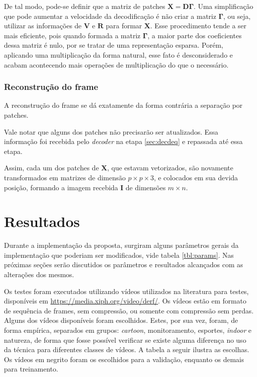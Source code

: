 \documentclass[cic,tc]{iiufrgs}
\newcommand{\mat}[1]{\bm{#1}}
\begin{document}
De tal modo, pode-se definir que a matriz de patches $\mat{X} = \mat{D} \mat{\Gamma}$.
Uma simplificação que pode aumentar a velocidade da decodificação é não criar a matriz $\mat{\Gamma}$,
ou seja, utilizar as informações de $\mat{V}$ e $\mat{R}$ para formar $\mat{X}$. 
Esse procedimento tende a ser mais eficiente, pois quando formada a matriz $\mat{\Gamma}$, 
a maior parte dos coeficientes dessa matriz é nulo, por se tratar de uma representação esparsa.
Porém, aplicando uma multiplicação da forma natural, esse fato é desconsiderado e acabam
acontecendo mais operações de multiplicação do que o necessário.

\subsection{Reconstrução do frame}
A reconstrução do frame se dá exatamente da forma contrária a separação por patches.

Vale notar que alguns dos patches não precisarão ser atualizados.
Essa informação foi recebida pelo \textit{decoder} na etapa \ref{sec:decdeq} e repassada
até essa etapa.

Assim, cada um dos patches de $\mat{X}$, que estavam vetorizados, são novamente transformados
em matrizes de dimensão $p \times p \times 3$, e colocados em sua devida posição, formando
a imagem recebida $\mat{I}$ de dimensões $m \times n$.

\chapter{Resultados}
\label{sec:results}
Durante a implementação da proposta, surgiram alguns parâmetros gerais da implementação
que poderiam ser modificados, vide tabela \ref{tbl:params}. 
Nas próximas seções serão discutidos os parâmetros e resultados alcançados com as 
alterações dos mesmos.

Os testes foram executados utilizando vídeos utilizados na literatura para testes,
disponíveis em \url{https://media.xiph.org/video/derf/}.
Os vídeos estão em formato de sequência de frames, sem compressão, ou somente com 
compressão sem perdas.
Alguns dos vídeos disponíveis foram escolhidos.
Estes, por sua vez, foram, de forma empírica, separados em grupos: \textit{cartoon}, 
monitoramento, esportes, \textit{indoor} e natureza, de forma que fosse possível 
verificar se existe alguma diferença no uso da técnica para diferentes classes de vídeos.
A tabela a seguir ilustra as escolhas.
Os vídeos em negrito foram os escolhidos para a validação, enquanto os demais para treinamento.
\end{document}
